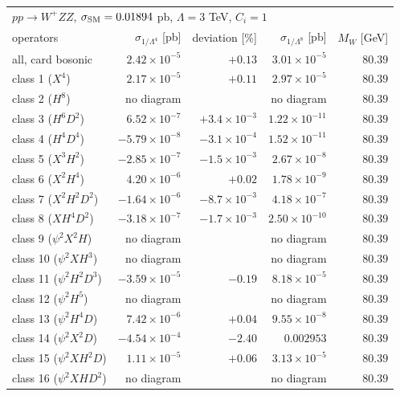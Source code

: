 \begin{table}[t]\centering\footnotesize\setlength{\tabcolsep}{4pt}
\begin{tabular}{@{}lrrrr@{}}\hline
\multicolumn{5}{l}{$p p \to W^+ Z Z$, $\sigma_{\rm SM} = 0.01894$ pb, $\Lambda = 3$ TeV, $C_i = 1$}\\
operators & $\sigma_{1/\Lambda^4}$ [pb] & deviation [\%] & $\sigma_{1/\Lambda^8}$ [pb] & $M_W$ [GeV]\\\hline
all, card bosonic & $2.42\times 10^{-5}$ & $+0.13$ & $3.01\times 10^{-5}$ & $80.39$\\
class 1 ($X^4$) & $2.17\times 10^{-5}$ & $+0.11$ & $2.97\times 10^{-5}$ & $80.39$\\
class 2 ($H^8$) & no diagram &  & no diagram & $80.39$\\
class 3 ($H^6 D^2$) & $6.52\times 10^{-7}$ & $+3.4\times 10^{-3}$ & $1.22\times 10^{-11}$ & $80.39$\\
class 4 ($H^4 D^4$) & $-5.79\times 10^{-8}$ & $-3.1\times 10^{-4}$ & $1.52\times 10^{-11}$ & $80.39$\\
class 5 ($X^3 H^2$) & $-2.85\times 10^{-7}$ & $-1.5\times 10^{-3}$ & $2.67\times 10^{-8}$ & $80.39$\\
class 6 ($X^2 H^4$) & $4.20\times 10^{-6}$ & $+0.02$ & $1.78\times 10^{-9}$ & $80.39$\\
class 7 ($X^2 H^2 D^2$) & $-1.64\times 10^{-6}$ & $-8.7\times 10^{-3}$ & $4.18\times 10^{-7}$ & $80.39$\\
class 8 ($X H^4 D^2$) & $-3.18\times 10^{-7}$ & $-1.7\times 10^{-3}$ & $2.50\times 10^{-10}$ & $80.39$\\
class 9 ($\psi^2 X^2 H$) & no diagram &  & no diagram & $80.39$\\
class 10 ($\psi^2 X H^3$) & no diagram &  & no diagram & $80.39$\\
class 11 ($\psi^2 H^2 D^3$) & $-3.59\times 10^{-5}$ & $-0.19$ & $8.18\times 10^{-5}$ & $80.39$\\
class 12 ($\psi^2 H^5$) & no diagram &  & no diagram & $80.39$\\
class 13 ($\psi^2 H^4 D$) & $7.42\times 10^{-6}$ & $+0.04$ & $9.55\times 10^{-8}$ & $80.39$\\
class 14 ($\psi^2 X^2 D$) & $-4.54\times 10^{-4}$ & $-2.40$ & $0.002953$ & $80.39$\\
class 15 ($\psi^2 X H^2 D$) & $1.11\times 10^{-5}$ & $+0.06$ & $3.13\times 10^{-5}$ & $80.39$\\
class 16 ($\psi^2 X H D^2$) & no diagram &  & no diagram & $80.39$\\

\end{tabular}
\end{table}
